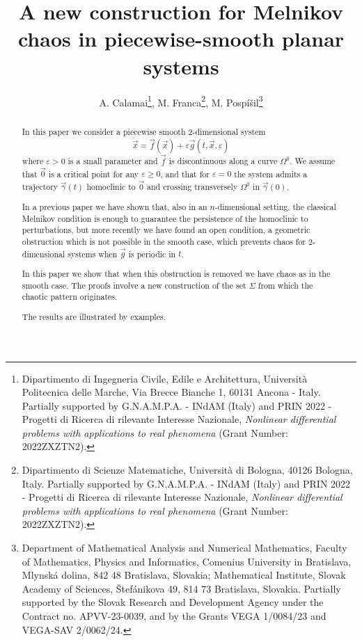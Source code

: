 \documentclass[10pt]{article}
\numberwithin{equation}{section}
\def\ga{\vec{\gamma}}
\def\ep{\varepsilon}
\def\Om{\Omega}
\def\x{\vec{x}}
\def\f{\vec{f}}
\def\g{\vec{g}}
\theoremstyle{definition}
\theoremstyle{remark}
\begin{document}
\title{A new construction for Melnikov chaos in piecewise-smooth planar systems}
\pagestyle{myheadings}
\date{}



\author{	
A. Calamai\thanks{Dipartimento di Ingegneria Civile, Edile e Architettura,
Universit\`a Politecnica delle Marche, Via Brecce Bianche 1, 60131 Ancona -
Italy. Partially supported by G.N.A.M.P.A. - INdAM (Italy) and
PRIN 2022 - Progetti di Ricerca di rilevante Interesse Nazionale, \emph{Nonlinear differential
problems with applications to real phenomena} (Grant Number: 2022ZXZTN2).
},
M. Franca\thanks{Dipartimento di Scienze Matematiche, Universit\`a di Bologna, 40126 Bologna, Italy.
 Partially supported by G.N.A.M.P.A. - INdAM (Italy) and PRIN 2022 - Progetti di Ricerca di rilevante Interesse Nazionale, \emph{Nonlinear
 differential
problems with applications to real phenomena} (Grant Number: 2022ZXZTN2). },
M. Posp\' i\v sil\thanks{Department of Mathematical Analysis and Numerical Mathematics, Faculty of Mathematics, Physics and Informatics,
Comenius University in Bratislava,
Mlynsk\'a dolina, 842 48 Bratislava, Slovakia; Mathematical Institute, Slovak Academy of Sciences, \v Ste\-f\'a\-ni\-ko\-va 49, 814 73
Bratislava, Slovakia.
Partially supported by the Slovak Research and Development Agency under the Contract no. APVV-23-0039, and by the Grants VEGA 1/0084/23 and
VEGA-SAV 2/0062/24.}
}


\maketitle


\begin{abstract}
In this paper we consider a piecewise smooth $2$-dimensional system
\begin{equation*}\label{e.ab}
\dot{\x}=\f (\x)+\ep\g(t,\x,\ep)
\end{equation*}
where $\ep>0$ is a small parameter and $\f$ is discontinuous along a curve $\Om^0$.
We assume that $\vec{0}$ is a critical point for any $\ep \ge 0$,  and that  for $\ep=0$ the system  admits a trajectory
$\ga(t)$ homoclinic to $\vec{0}$ and crossing transversely $\Om^0$ in $\ga(0)$.

 In a previous paper we have shown that, also in an $n$-dimensional setting,   the classical Melnikov condition is enough to guarantee the persistence of the homoclinic
to perturbations, but  more recently  we have found an open condition, a geometric obstruction which is not possible in the smooth case,
which prevents chaos  for $2$-dimensional systems  when $\g$ is periodic in $t$.

In this paper we show that when this obstruction is removed we have chaos as in the smooth case. The proofs involve
a new construction of the set $\Sigma$ from which the chaotic pattern originates.

The results are illustrated by examples.
\end{abstract}
\end{document}
